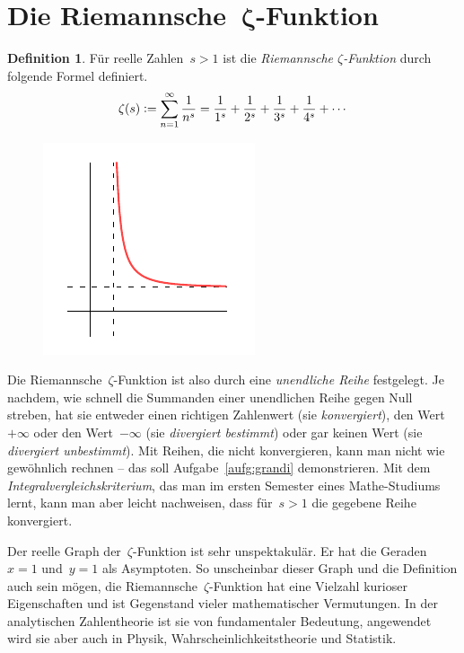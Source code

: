 \documentclass[twoside]{../zirkelblatt1415}
\theoremstyle{definition}
\newtheorem{defn}{Definition}[section]
\theoremstyle{plain}
\theoremstyle{remark}
\newcommand{\defeq}{\vcentcolon=}
\begin{document}
\section{\texorpdfstring{Die Riemannsche~$\boldsymbol{\zeta}$-Funktion}{Die
Riemannsche~ζ-Funktion}}

\begin{defn}Für reelle Zahlen~$s > 1$ ist die \emph{Riemannsche
$\zeta$-Funktion} durch folgende Formel definiert.
\[ \zeta(s) \defeq \sum_{n=1}^\infty \frac{1}{n^s} =
  \frac{1}{1^s} + \frac{1}{2^s} + \frac{1}{3^s} + \frac{1}{4^s} + \cdots \]
\end{defn}

\setlength{\wrapoverhang}{1cm}
\setlength{\columnsep}{0.5cm}
\begin{figure}
\vspace{-4em}
\includegraphics[scale=1]{zeta-function-real}
\end{figure}
Die Riemannsche~$\zeta$-Funktion ist also durch eine \emph{unendliche Reihe}
festgelegt. Je nachdem, wie schnell die Summanden einer unendlichen Reihe gegen
Null streben, hat sie entweder einen richtigen Zahlenwert (sie
\emph{konvergiert}), den Wert~$+\infty$ oder den Wert~$-\infty$ (sie
\emph{divergiert bestimmt}) oder gar keinen Wert (sie \emph{divergiert
unbestimmt}). Mit Reihen, die nicht konvergieren, kann man nicht wie gewöhnlich
rechnen -- das soll Aufgabe~\ref{aufg:grandi} demonstrieren. Mit dem
\emph{Integralvergleichskriterium}, das man im ersten Semester eines
Mathe-Studiums lernt, kann man aber leicht nachweisen, dass für~$s > 1$ die
gegebene Reihe konvergiert.

Der reelle Graph der~$\zeta$-Funktion ist sehr unspektakulär. Er hat
die Geraden~$x = 1$ und~$y = 1$ als Asymptoten.
So unscheinbar dieser Graph und die Definition auch sein mögen, die Riemannsche~$\zeta$-Funktion
hat eine Vielzahl kurioser Eigenschaften und ist Gegenstand vieler
mathematischer Vermutungen. In der analytischen Zahlentheorie ist sie von
fundamentaler Bedeutung, angewendet wird sie aber auch in Physik,
Wahrscheinlichkeitstheorie und Statistik.
\end{document}
